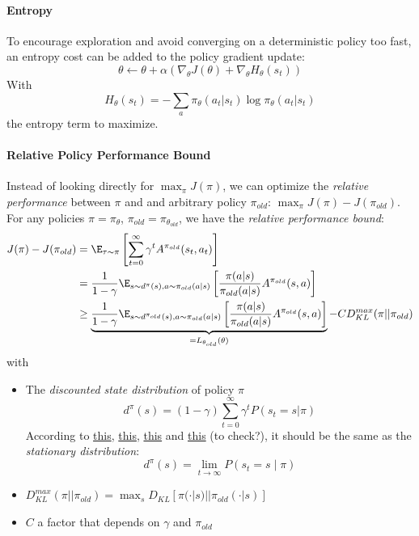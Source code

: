 \paragraph{Entropy}
To encourage exploration and avoid converging on a deterministic policy too fast, an entropy cost can be added to the policy gradient update: 
\[
    \theta \leftarrow \theta + \alpha (\nabla_\theta J(\theta) + \nabla_\theta H_\theta(s_t))
\]
With
\[
    H_\theta(s_t) = - \sum_a \pi_\theta(a_t|s_t) \log \pi_\theta(a_t|s_t)
\]
the entropy term to maximize.

\paragraph{Relative Policy Performance Bound}
Instead of looking directly for $\max_\pi J(\pi)$, we can optimize the \emph{relative performance} between $\pi$ and and arbitrary policy $\pi_{old}$: $\max_\pi J(\pi) - J(\pi_{old})$. For any policies $\pi = \pi_\theta$, $\pi_{old} = \pi_{\theta_{old}}$, we have the \emph{relative performance bound}:
\begin{align}
    J(\pi) - J(\pi_{old}) 
    &= \E_{\tau \sim \pi} \left[ \sum_{t=0}^\infty \gamma^t A^{\pi_{old}}(s_t,a_t) \right] \nonumber\\
    &= \frac{1}{1-\gamma} \E_{s\sim d^\pi(s), a \sim \pi_{old}(a|s)} \left[ \frac{\pi(a|s)}{\pi_{old}(a|s)} A^{\pi_{old}}(s,a)\right] \nonumber\\
    &\geq \underbrace{\frac{1}{1-\gamma} \E_{s\sim d^{\pi_{old}}(s), a \sim \pi_{old}(a|s)} \left[ 
        \frac{\pi(a|s)}{\pi_{old}(a|s)} A^{\pi_{old}}(s,a)
    \right]}_{=L_{\theta_{old}}(\theta)} - C D_{KL}^{max}(\pi || \pi_{old})
    \label{eq:performance-bound}
\end{align}
with
\begin{itemize}
    \item The \emph{discounted state distribution} of policy $\pi$
    \begin{equation}
        d^\pi(s) = (1-\gamma) \sum_{t=0}^\infty \gamma^t P(s_{t}=s|\pi)
    \label{eq:stationary-state-distribution}
    \end{equation}
    According to \href{https://eva.fing.edu.uy/pluginfile.php/343525/mod_resource/content/1/modern_methods.pdf}{this}, \href{https://lilianweng.github.io/lil-log/2018/04/08/policy-gradient-algorithms.html#policy-gradient-theorem}{this}, \href{https://www.alexirpan.com/rl-derivations/#state-visitation--occupency-measure}{this} and \href{https://proceedings.neurips.cc//paper/2020/file/69bfa2aa2b7b139ff581a806abf0a886-Paper.pdf}{this} (to check?), it should be the same as the \emph{stationary distribution}:
    \[
        d^\pi(s) = \lim_{t\rightarrow \infty} P(s_t = s \mid \pi)
    \]
    \item $D_{KL}^{max}(\pi || \pi_{old}) = \max_s D_{KL}[\pi(\cdot|s) || \pi_{old}(\cdot|s)]$
    \item $C$ a factor that depends on $\gamma$ and $\pi_{old}$
\end{itemize}

